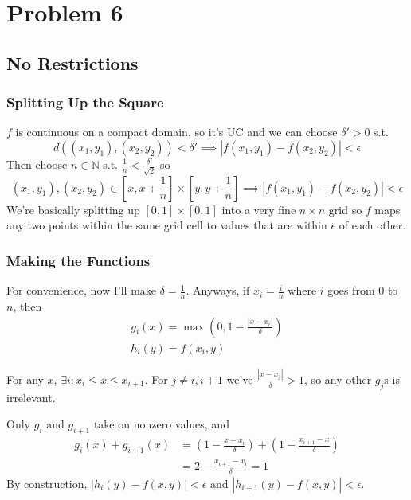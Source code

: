 \documentclass[12pt]{article}
\newcommand{\N}{\mathbb{N}}
\begin{document}
\pagebreak

\section{Problem 6}

\subsection{No Restrictions}

\subsubsection{Splitting Up the Square}

$f$ is continuous on a compact domain, so it's UC and we can choose $\delta' > 0$ s.t.
\[d((x_1, y_1), (x_2, y_2)) < \delta' \implies |f(x_1, y_1)-f(x_2, y_2)| < \epsilon\]
Then choose $n \in \N$ s.t. $\frac{1}{n} < \frac{\delta'}{\sqrt{2}}$ so
\[(x_1, y_1), (x_2, y_2) \in \left[x, x + \frac{1}{n}\right] \times \left[y, y + \frac{1}{n}\right] \implies |f(x_1, y_1)-f(x_2, y_2)| < \epsilon\]
We're basically splitting up $[0, 1] \times [0, 1]$ into a very fine $n \times n$
grid so $f$ maps any two points within the same grid cell to values that are within $\epsilon$ of each other.

\subsubsection{Making the Functions}

For convenience, now I'll make $\delta=\frac{1}{n}$.
Anyways, if $x_i=\frac{i}{n}$ where $i$ goes from $0$ to $n$, then
\begin{gather*}
  g_i(x)=\max\left(0, 1-\frac{|x-x_i|}{\delta}\right) \\
  h_i(y)=f(x_i, y)
\end{gather*}

For any $x$, $\exists i: x_i \le x \le x_{i+1}$.
For $j \ne i, i+1$ we've $\frac{|x-x_j|}{\delta} > 1$, so any other $g_j$s is irrelevant.

Only $g_i$ and $g_{i+1}$ take on nonzero values, and
\begin{align*}
  g_i(x)+g_{i+1}(x)
  &=\left(1-\frac{x-x_i}{\delta}\right)+\left(1-\frac{x_{i+1}-x}{\delta}\right) \\
  &= 2 - \frac{x_{i+1}-x_i}{\delta} = 1
\end{align*}
By construction, $|h_i(y)-f(x, y)| < \epsilon$ and $|h_{i+1}(y)-f(x, y)| < \epsilon$.
\end{document}

